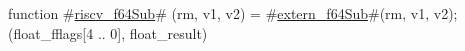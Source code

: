 function #\hyperref[sailRISCVzriscvzyf64Sub]{riscv\_f64Sub}# (rm, v1, v2) = {
  #\hyperref[sailRISCVzexternzyf64Sub]{extern\_f64Sub}#(rm, v1, v2);
  (float_fflags[4 .. 0], float_result)
}
